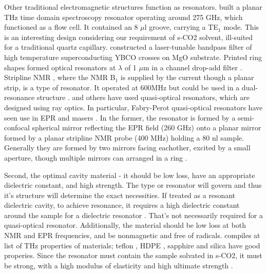 Other traditional electromagnetic structures function as resonators. \cite{mendis2009terahertz} built a planar THz time domain spectroscopy resonator operating around 275 GHz, which functioned as a flow cell. It contained an 8 $\mu$l groove, carrying a TE$_1$ mode. This is an interesting design considering our requirement of s-CO2 solvent, ill-suited for a traditional quartz capillary. \cite{zhang1991optical} constructed a laser-tunable bandpass filter of high temperature superconducting YBCO crosses on MgO substrate. Printed ring shapes formed optical resonators at $\lambda$ of 1 $\mu$m in a channel drop-add filter \cite{little1997microring}. Stripline NMR \cite{tijssen2016stripline}, where the NMR B$_1$ is supplied by the current though a planar strip, is a type of resonator. It operated at 600MHz but could be used in a dual-resonance structure \cite{denysenkov2012liquid}. \cite{denysenkov2012liquid} and others have used quasi-optical resonators, which are designed using ray optics. In particular, Fabry-Perot quasi-optical resonators have seen use in EPR \cite{denysenkov2012liquid} and masers \cite{fox1961resonant}. In the former, the resonator is formed by a semi-confocal spherical mirror reflecting the EPR field (260 GHz) onto a planar mirror formed by a planar stripline NMR probe (400 MHz) holding a 80 nl sample.  Generally they are formed by two mirrors facing eachother, excited by a small aperture, though multiple mirrors can arranged in a ring \cite{schulten1967microwave}. 

Second, the optimal cavity material - it should be low loss, have an appropriate dielectric constant, and high strength. The type or resonator will govern and thus it's structure will determine the exact necessities. If treated as a resonant dielectric cavity, to achieve resonance, it requires a high dielectric constant around the sample for a dielectric resonator \cite{balanis2012advanced}. That's not necessarily required for a quasi-optical resonator. Additionally, the material should be low loss at both NMR and EPR frequencies, and be nonmagnetic and free of radicals. \cite{lamb1996miscellaneous} compiles at list of THz properties of materials; teflon \cite{goto2004teflon}, HDPE \cite{han2002terahertz}, sapphire and silica\cite{tocho2012optical} have good properies. Since the resonator must contain the sample solvated in s-CO2, it must be strong, with a high modulus of elasticity and high ultimate strength \cite{sapphire,teflon,quartz}.


